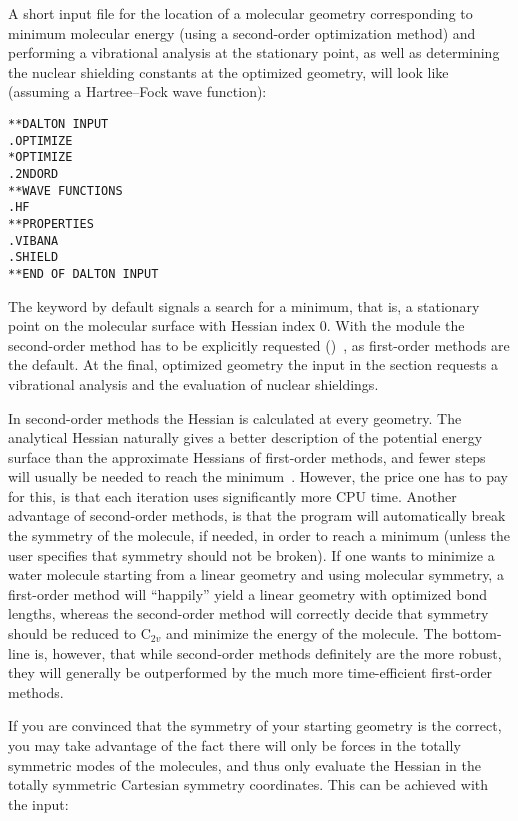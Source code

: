 A short input file for the location of a molecular geometry
corresponding to minimum molecular energy
(using a second-order optimization
method) and performing a vibrational
analysis at the stationary point, as well
as determining the nuclear
shielding constants at the optimized
geometry, will look like
(assuming a Hartree--Fock wave function):

\begin{verbatim}
**DALTON INPUT
.OPTIMIZE
*OPTIMIZE
.2NDORD
**WAVE FUNCTIONS
.HF
**PROPERTIES
.VIBANA
.SHIELD
**END OF DALTON INPUT
\end{verbatim}

The keyword  by default signals a search for a minimum,
that is, a stationary point on the molecular surface with Hessian
index 0. With the 
module the second-order method has to be explicitly requested
()~\cite{tuhjahjajpjjcp84}, as first-order methods are the default. At the final,
optimized geometry the input in the  section requests a
vibrational analysis and the evaluation of nuclear shieldings.

In second-order methods the Hessian is calculated at every
geometry. The analytical Hessian naturally gives a better description
of the potential energy surface than the approximate Hessians of
first-order methods, and fewer steps will usually be needed to reach
the minimum~\cite{vbthjcp117}. However, the price one has to pay for this, is that each
iteration uses significantly more CPU time. Another advantage of
second-order methods, is that the program will automatically break the symmetry
of the molecule, if needed, in order to reach a minimum
(unless the user specifies that symmetry should not be broken). If
one wants to minimize a water molecule starting from a linear
geometry and using molecular symmetry, a first-order method will
``happily'' yield a linear geometry with optimized bond lengths, whereas
the second-order method will correctly decide that symmetry should be
reduced to C$_{2v}$ and minimize the energy of the molecule.
The bottom-line is, however, that while second-order methods
definitely are the more robust, they will generally be outperformed by
the much more time-efficient first-order methods.

If you are convinced that the symmetry of your starting geometry
is the correct, you may take advantage of the fact there will only
be forces in the totally symmetric modes of the molecules,
and thus only evaluate the Hessian in the totally symmetric
Cartesian symmetry coordinates. This can be achieved with the
input:

